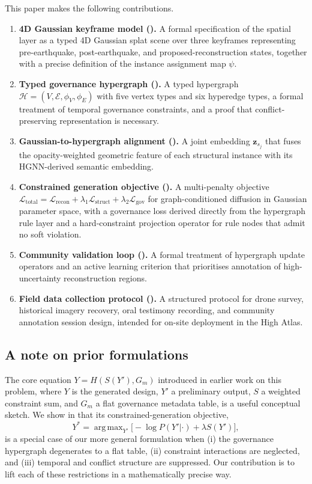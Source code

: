 \documentclass[11pt,a4paper]{article}
\theoremstyle{plain}
\theoremstyle{definition}
\theoremstyle{remark}
\DeclareMathOperator*{\argmax}{arg\,max}
\newcommand{\HG}{\mathcal{H}}
\newcommand{\inst}{\psi}
\newcommand{\zvec}{\mathbf{z}}
\newcommand{\Lrec}{\mathcal{L}_{\mathrm{recon}}}
\newcommand{\Lstruct}{\mathcal{L}_{\mathrm{struct}}}
\newcommand{\Lgov}{\mathcal{L}_{\mathrm{gov}}}
\newcommand{\Ltot}{\mathcal{L}_{\mathrm{total}}}
\begin{document}
This paper makes the following contributions.
\begin{enumerate}[leftmargin=2em]
  \item \textbf{4D Gaussian keyframe model ().}
    A formal specification of the spatial layer as a typed 4D Gaussian
    splat scene over three keyframes representing pre-earthquake,
    post-earthquake, and proposed-reconstruction states, together with
    a precise definition of the instance assignment map $\inst$.
  \item \textbf{Typed governance hypergraph ().}
    A typed hypergraph $\HG = (V, \mathcal{E}, \phi_V, \phi_E)$ with
    five vertex types and six hyperedge types, a formal treatment of
    temporal governance constraints, and a proof that conflict-preserving
    representation is necessary.
  \item \textbf{Gaussian-to-hypergraph alignment ().}
    A joint embedding $\zvec_{s_j}$ that fuses the opacity-weighted
    geometric feature of each structural instance with its HGNN-derived
    semantic embedding.
  \item \textbf{Constrained generation objective ().}
    A multi-penalty objective $\Ltot = \Lrec + \lambda_1\Lstruct +
    \lambda_2\Lgov$ for graph-conditioned diffusion in Gaussian parameter
    space, with a governance loss derived directly from the hypergraph
    rule layer and a hard-constraint projection operator for rule nodes
    that admit no soft violation.
  \item \textbf{Community validation loop ().}
    A formal treatment of hypergraph update operators and an active
    learning criterion that prioritises annotation of high-uncertainty
    reconstruction regions.
  \item \textbf{Field data collection protocol ().}
    A structured protocol for drone survey, historical imagery recovery,
    oral testimony recording, and community annotation session design,
    intended for on-site deployment in the High Atlas.
\end{enumerate}

\subsection{A note on prior formulations}
\label{sec:prior_formulation}

The core equation $Y = H(S(Y'), G_m)$ introduced in earlier work on
this problem, where $Y$ is the generated design, $Y'$ a preliminary
output, $S$ a weighted constraint sum, and $G_m$ a flat governance
metadata table, is a useful conceptual sketch. We show in
 that its constrained-generation objective,
\begin{equation}
  Y^* = \argmax_{Y'}\bigl[-\log P(Y'|\cdot) + \lambda S(Y')\bigr],
  \label{eq:prior_obj}
\end{equation}
is a special case of our more general formulation when (i) the governance
hypergraph degenerates to a flat table, (ii) constraint interactions
are neglected, and (iii) temporal and conflict structure are suppressed.
Our contribution is to lift each of these restrictions in a mathematically
precise way.
\end{document}
